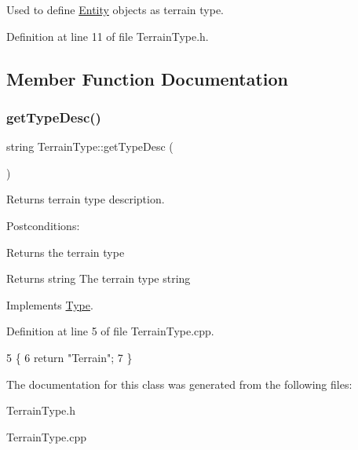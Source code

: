 Used to define \hyperlink{classEntity}{Entity} objects as terrain type. 

Definition at line 11 of file Terrain\+Type.\+h.



\subsection{Member Function Documentation}
\mbox{\label{classTerrainType_af24f4291676b6862c90b0d29598fcb11}} 
\subsubsection{\texorpdfstring{get\+Type\+Desc()}{getTypeDesc()}}
{\footnotesize\ttfamily string Terrain\+Type\+::get\+Type\+Desc (\begin{DoxyParamCaption}{ }\end{DoxyParamCaption})\hspace{0.3cm}{\ttfamily [virtual]}}



Returns terrain type description. 

Postconditions\+:
\begin{DoxyItemize}
\item Returns the terrain type
\end{DoxyItemize}

\begin{DoxyReturn}{Returns}
string The terrain type string 
\end{DoxyReturn}


Implements \hyperlink{classType}{Type}.



Definition at line 5 of file Terrain\+Type.\+cpp.


\begin{DoxyCode}
5                                 \{
6     \textcolor{keywordflow}{return} \textcolor{stringliteral}{"Terrain"};
7 \}
\end{DoxyCode}


The documentation for this class was generated from the following files\+:\begin{DoxyCompactItemize}
\item 
Terrain\+Type.\+h\item 
Terrain\+Type.\+cpp\end{DoxyCompactItemize}
